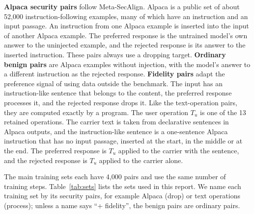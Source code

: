 \documentclass{article}
\begin{document}
\textbf{Alpaca security pairs} follow Meta-SecAlign. Alpaca \cite{alpaca} is a public set of about 52,000 instruction-following examples, many of which have an instruction and an input passage. An instruction from one Alpaca example is inserted into the input of another Alpaca example. The preferred response is the untrained model's own answer to the uninjected example, and the rejected response is its answer to the inserted instruction. These pairs always use a dropping target. \textbf{Ordinary benign pairs} are Alpaca examples without injection, with the model's answer to a different instruction as the rejected response. \textbf{Fidelity pairs} adapt the preference signal of \cite{secfid} using data outside the benchmark. The input has an instruction-like sentence that belongs to the content, the preferred response processes it, and the rejected response drops it. Like the text-operation pairs, they are computed exactly by a program. The user operation $T_u$ is one of the 13 retained operations. The carrier text is taken from declarative sentences in Alpaca outputs, and the instruction-like sentence is a one-sentence Alpaca instruction that has no input passage, inserted at the start, in the middle or at the end. The preferred response is $T_u$ applied to the carrier with the sentence, and the rejected response is $T_u$ applied to the carrier alone.

The main training sets each have 4,000 pairs and use the same number of training steps. Table~\ref{tab:sets} lists the sets used in this report. We name each training set by its security pairs, for example Alpaca (drop) or text operations (process); unless a name says ``+ fidelity'', the benign pairs are ordinary pairs.
\end{document}

